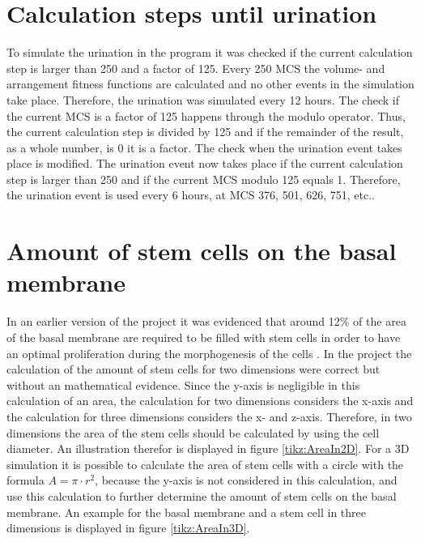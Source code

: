 \section{Calculation steps until urination}\label{sec:calculationStpesUntilUrination}
To simulate the urination in the program it was checked if the current calculation step is larger than 250 and a factor of 125. Every 250 \ac{MCS} the volume- and arrangement fitness functions are calculated and no other events in the simulation take place. Therefore, the urination was simulated every 12 hours. The check if the current \ac{MCS} is a factor of 125 happens through the modulo operator. Thus, the current calculation step is divided by 125 and if the remainder of the result, as a whole number, is 0 it is a factor. \newline
The check when the urination event takes place is modified. The urination event now takes place if the current calculation step is larger than 250 and if the current \ac{MCS} modulo 125 equals 1. Therefore, the urination event is used every 6 hours, at \ac{MCS} 376, 501, 626, 751, etc.. 

\section{Amount of stem cells on the basal membrane}\label{sec:AmountStemCellsBasalMembrane}
In an earlier version of the project it was evidenced that around 12\% of the area of the basal membrane are required to be filled with stem cells in order to have an optimal proliferation during the morphogenesis of the cells \cite{Torelli2017}.
In the project the calculation of the amount of stem cells for two dimensions were correct but without an mathematical evidence. \newline
Since the y-axis is negligible in this calculation of an area, the calculation for two dimensions considers the x-axis and the calculation for three dimensions considers the x- and z-axis. Therefore, in two dimensions the area of the stem cells should be calculated by using the cell diameter. An illustration therefor is displayed in figure \ref{tikz:AreaIn2D}. For a 3D simulation it is possible to calculate the area of stem cells with a circle with the formula $A = \pi \cdot r^{2}$, because the y-axis is not considered in this calculation, and use this calculation to further determine the amount of stem cells on the basal membrane. An example for the basal membrane and a stem cell in three dimensions is displayed in figure \ref{tikz:AreaIn3D}. 

